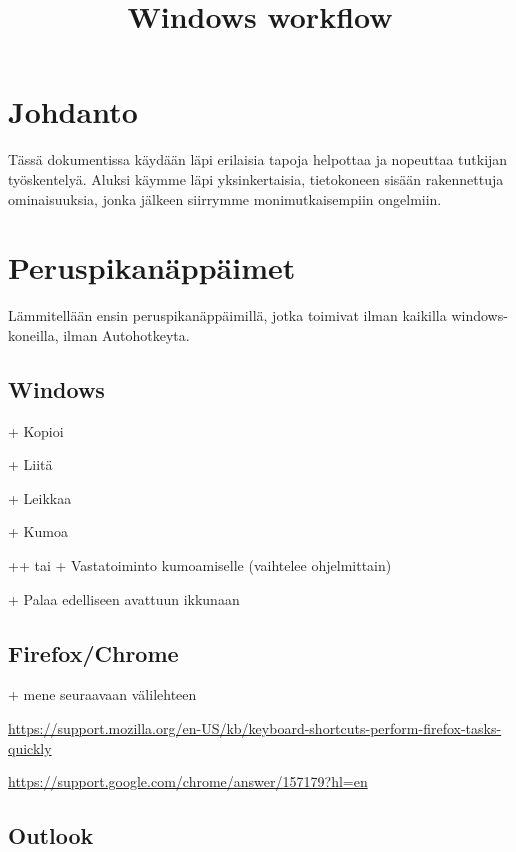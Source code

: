 \documentclass[a5paper,9pt]{scrartcl}
\title{Windows workflow}
\begin{document}
 
    \section{Johdanto}
    Tässä dokumentissa käydään läpi erilaisia tapoja helpottaa ja nopeuttaa tutkijan työskentelyä. Aluksi käymme läpi yksinkertaisia, tietokoneen sisään rakennettuja ominaisuuksia, jonka jälkeen siirrymme monimutkaisempiin ongelmiin.
    
    \section{Peruspikanäppäimet}
    Lämmitellään ensin peruspikanäppäimillä, jotka toimivat ilman kaikilla windows-koneilla, ilman Autohotkeyta.
    
    \subsection{Windows}
    
    + Kopioi 
    
    + Liitä 
    
    + Leikkaa 
    
    + Kumoa
    
    ++ tai + Vastatoiminto kumoamiselle (vaihtelee ohjelmittain)
    
    + Palaa edelliseen avattuun ikkunaan
    
    \subsection{Firefox/Chrome}
    
    + mene seuraavaan välilehteen
    
	\url{https://support.mozilla.org/en-US/kb/keyboard-shortcuts-perform-firefox-tasks-quickly}
	
	
	
	
	
    
    \url{https://support.google.com/chrome/answer/157179?hl=en}
    
    
	\subsection{Outlook}
	
\end{document}
